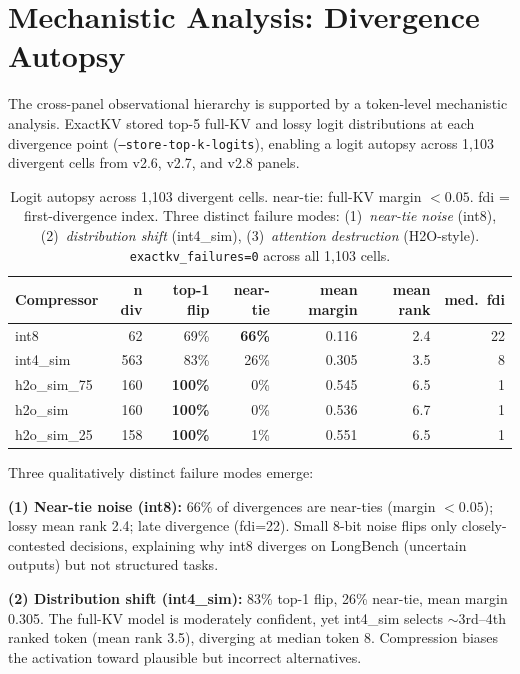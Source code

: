 \documentclass[11pt]{article}
\begin{document}
\section{Mechanistic Analysis: Divergence Autopsy}
\label{sec:autopsy-main}

\begin{sloppypar}
The cross-panel observational hierarchy is supported by a token-level mechanistic analysis.
ExactKV stored top-5 full-KV and lossy logit distributions at each divergence point
(\texttt{--store-top-k-logits}), enabling a logit autopsy across 1{,}103 divergent cells
from v2.6, v2.7, and v2.8 panels.
\end{sloppypar}
\begin{table}[htbp]
\centering\small\setlength\tabcolsep{5pt}
\begin{tabular}{lrrrrrr}
\toprule
\textbf{Compressor} & \textbf{n div} & \textbf{top-1 flip} & \textbf{near-tie} & \textbf{mean margin} & \textbf{mean rank} & \textbf{med.\ fdi} \\
\midrule
int8 & 62 & 69\% & \textbf{66\%} & 0.116 & 2.4 & 22 \\
int4\_sim & 563 & 83\% & 26\% & 0.305 & 3.5 & 8 \\
h2o\_sim\_75 & 160 & \textbf{100\%} & 0\% & 0.545 & 6.5 & 1 \\
h2o\_sim & 160 & \textbf{100\%} & 0\% & 0.536 & 6.7 & 1 \\
h2o\_sim\_25 & 158 & \textbf{100\%} & 1\% & 0.551 & 6.5 & 1 \\
\bottomrule
\end{tabular}
\caption{Logit autopsy across 1,103 divergent cells. near-tie: full-KV margin $<0.05$.
fdi = first-divergence index. Three distinct failure modes: (1)~\emph{near-tie noise}
(int8), (2)~\emph{distribution shift} (int4\_sim), (3)~\emph{attention destruction}
(H2O-style). \texttt{exactkv\_failures=0} across all 1,103 cells.}
\label{tab:autopsy-main}
\end{table}

Three qualitatively distinct failure modes emerge:

\textbf{(1) Near-tie noise (int8):} 66\% of divergences are near-ties (margin $<0.05$);
lossy mean rank 2.4; late divergence (fdi=22). Small 8-bit noise flips only closely-contested
decisions, explaining why int8 diverges on LongBench (uncertain outputs) but not structured tasks.

\textbf{(2) Distribution shift (int4\_sim):} 83\% top-1 flip, 26\% near-tie, mean margin
0.305. The full-KV model is moderately confident, yet int4\_sim selects $\sim$3rd--4th
ranked token (mean rank 3.5), diverging at median token 8. Compression biases the
activation toward plausible but incorrect alternatives.
\end{document}
